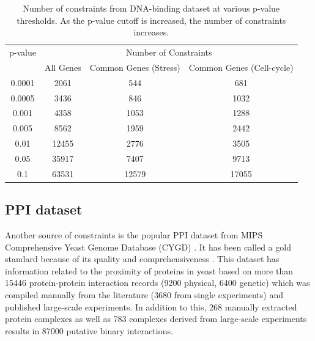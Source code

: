 \begin{table}
\centering
\begin{tabular}{|c|c|c|c|}
\hline
p-value & \multicolumn{3}{|c|}{Number of Constraints} \\ \cline{2-4}
& All Genes & Common Genes (Stress) & Common Genes (Cell-cycle)\\
\hline
0.0001 & 2061  & 544   & 681\\
0.0005 & 3436  & 846   & 1032\\
0.001  & 4358  & 1053  & 1288\\
0.005  & 8562  & 1959  & 2442\\
0.01   & 12455 & 2776  & 3505\\
0.05   & 35917 & 7407  & 9713\\
0.1    & 63531 & 12579 & 17055\\
\hline 
\end{tabular}
\caption[Number of constraints from DNA-binding dataset at various p-value thresholds]{Number of constraints from DNA-binding dataset at various p-value thresholds. As the p-value 
cutoff is increased, the number of constraints increases.}
\label{tab:no_constraints}
\end{table}

\subsection{PPI dataset}
Another source of constraints is the popular PPI dataset from MIPS Comprehensive Yeast Genome Database (CYGD) \citep{Gueldener2006MPact}. It has been called a gold standard 
because of its quality and comprehensiveness \citep{yu2004annotation}. This dataset has information related to the proximity of proteins in yeast based on more than 
15446 protein-protein interaction records (9200 physical, 6400 genetic) which was compiled manually from the literature (3680 from single experiments) and published large-scale 
experiments. In addition to this, 268 manually extracted protein complexes as well as 783 complexes derived from large-scale experiments results in 87000 putative 
binary interactions. 

